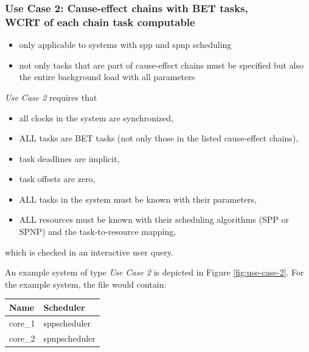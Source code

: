 \subsubsection{Use Case 2: Cause-effect chains with BET tasks,\\ WCRT of each chain task computable}
\label{sec:input-files-bet2}

\begin{tcolorbox}
\begin{itemize}[leftmargin=*, itemsep=0pt]
	\item only applicable to systems with \ac{spp} und \ac{spnp} scheduling
	\item not only tasks that are part of cause-effect chains must be specified but also the entire background load with all parameters
\end{itemize}
\end{tcolorbox}

\emph{Use Case 2} requires that
\begin{itemize}[leftmargin=*, itemsep=0pt]
	\item all clocks in the system are synchronized,
	\item ALL tasks are BET tasks (not only those in the listed cause-effect chains),
	\item task deadlines are implicit,	
	\item task offsets are zero,
	\item ALL tasks in the system must be known with their parameters,
	\item ALL resources must be known with their scheduling algorithms (SPP or SPNP) and the task-to-resource mapping,
\end{itemize}
which is checked in an interactive user query.
\bigskip


An example system of type \emph{Use Case 2} is depicted in Figure \ref{fig:use-case-2}.
For the example system, the file  would contain:

\begin{center}
\small
	\begin{tabular}{|l|l|} \hline
		\textbf{Name} & \textbf{Scheduler} \\ \hline	
		core\_1 & sppscheduler \\ \hline	
		core\_2 & spnpscheduler	\\ \hline		
	\end{tabular}
\end{center}

